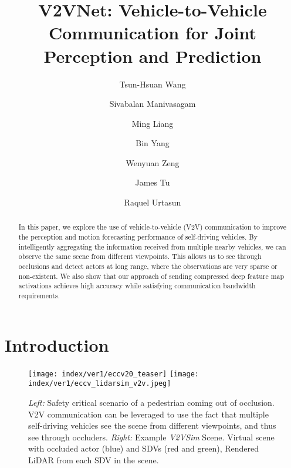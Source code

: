 \documentclass[runningheads]{llncs}
\begin{document}
\pagestyle{headings}
\mainmatter
\def\ECCVSubNumber{3838}  

\title{V2VNet: Vehicle-to-Vehicle Communication for Joint Perception and Prediction} 

\begin{comment}
\titlerunning{ECCV-20 submission ID \ECCVSubNumber}
\authorrunning{ECCV-20 submission ID \ECCVSubNumber}
\author{Anonymous ECCV submission}
\institute{Paper ID \ECCVSubNumber}
\end{comment}

\author{Tsun-Hsuan Wang \and
Sivabalan Manivasagam \and
Ming Liang \and
Bin Yang \and
Wenyuan Zeng \and
James Tu \and
Raquel Urtasun
}
\maketitle

\begin{abstract}
	In this paper, we explore the use of vehicle-to-vehicle (V2V) communication to improve the perception and motion forecasting performance of self-driving vehicles.
By intelligently aggregating the information received from multiple nearby vehicles, we can 
observe the same scene from different viewpoints. 
This allows us to see through occlusions and 
detect
 actors at long range, where the observations are very sparse or non-existent. 
We also show that our approach of sending 
compressed deep feature map activations
achieves high accuracy while satisfying communication bandwidth requirements.
\end{abstract}

\section{Introduction}

\begin{figure}[t]
  \centering
  \texttt{[image: index/ver1/eccv20\_teaser]}
  \texttt{[image: index/ver1/eccv\_lidarsim\_v2v.jpeg]}
 \caption{
\textit{Left:} Safety critical scenario of a pedestrian coming out of occlusion. 
V2V communication can be leveraged to use the fact that multiple self-driving vehicles see the scene from different viewpoints, and thus see through occluders.
\textit{Right:} 
Example \textit{V2VSim} Scene. Virtual scene with occluded actor (blue) and SDVs (red and green), Rendered LiDAR from each SDV in the scene.
}
  \label{fig:teaser}
\end{figure}
\end{document}
